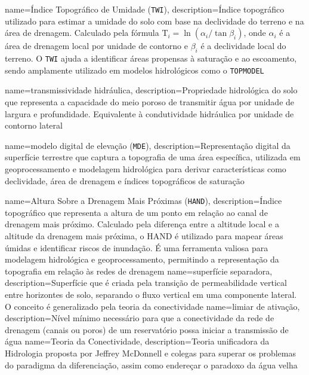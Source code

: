 {
    name=Índice Topográfico de Umidade (\texttt{TWI}),
    description={Índice topográfico utilizado para estimar a umidade do solo com base na declividade do terreno e na área de drenagem. Calculado pela fórmula $\text{T}_i = \ln{(\alpha_{i}/\tan \beta_{i})}$, onde $\alpha_{i}$ é a área de drenagem local por unidade de contorno e $\beta_{i}$ é a declividade local do terreno. O \texttt{TWI} ajuda a identificar áreas propensas à saturação e ao escoamento, sendo amplamente utilizado em modelos hidrológicos como o \texttt{TOPMODEL}}
}

{
    name=transmissividade hidráulica,
    description={Propriedade hidrológica do solo que representa a capacidade do meio poroso de transmitir água por unidade de largura e profundidade. Equivalente à condutividade hidráulica por unidade de contorno lateral}
}

{
    name=modelo digital de elevação (\texttt{MDE}),
    description={Representação digital da superfície terrestre que captura a topografia de uma área específica, utilizada em geoprocessamento e modelagem hidrológica para derivar características como declividade, área de drenagem e índices topográficos de saturação}
}

{
    name=Altura Sobre a Drenagem Mais Próximas (\texttt{HAND}),
    description={Índice topográfico que representa a altura de um ponto em relação ao canal de drenagem mais próximo. Calculado pela diferença entre a altitude local e a altitude da drenagem mais próxima, o HAND é utilizado para mapear áreas úmidas e identificar riscos de inundação. É uma ferramenta valiosa para modelagem hidrológica e geoprocessamento, permitindo a representação da topografia em relação às redes de drenagem}
}
{
    name=superfície separadora,
    description={Superfície que é criada pela transição de permeabilidade vertical entre horizontes de solo, separando o fluxo vertical em uma componente lateral. O conceito é generalizado pela teoria da conectividade}
}
{
    name=limiar de ativação,
    description={Nível mínimo necessário para que a conectividade da rede de drenagem (canais ou poros) de um reservatório possa iniciar a transmissão de água}
}
{
    name=Teoria da Conectividade,
    description={Teoria unificadora da Hidrologia proposta por Jeffrey McDonnell e colegas para superar os problemas do paradigma da diferenciação, assim como endereçar o paradoxo da água velha}
}

